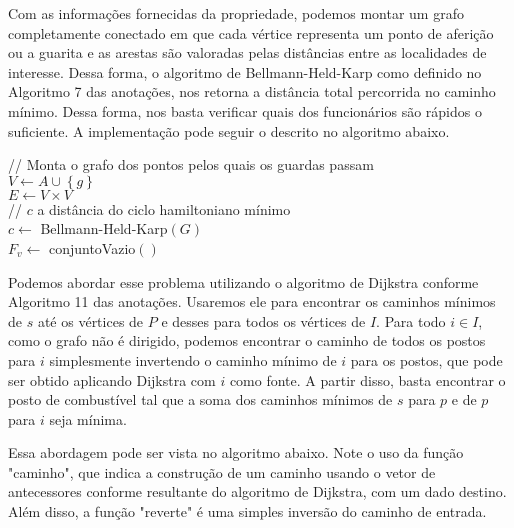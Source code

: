 \documentclass[a4paper]{report}
\begin{document}

Com as informações fornecidas da propriedade, podemos montar um grafo completamente conectado em que cada vértice representa um ponto de aferição ou a guarita e as arestas são valoradas pelas distâncias entre as localidades de interesse. Dessa forma, o algoritmo de Bellmann-Held-Karp como definido no Algoritmo 7 das anotações, nos retorna a distância total percorrida no caminho mínimo. Dessa forma, nos basta verificar quais dos funcionários são rápidos o suficiente. A implementação pode seguir o descrito no algoritmo abaixo.

\begin{algorithm}[H] 
    // Monta o grafo dos pontos pelos quais os guardas passam \\
    $V \gets A \cup \left\{ g \right\} $ \\
    $E \gets V\times V$ \\
    // $c$ a distância do ciclo hamiltoniano mínimo \\
    $c \gets$ Bellmann-Held-Karp$\left( G \right) $ \\

    $F_v \gets $ conjuntoVazio$()$\\
\end{algorithm}


Podemos abordar esse problema utilizando o algoritmo de Dijkstra conforme Algoritmo 11 das anotações. Usaremos ele para encontrar os caminhos mínimos de $s$ até os vértices de $P$ e desses para todos os vértices de $I$. Para todo $i \in I$, como o grafo não é dirigido, podemos encontrar o caminho de todos os postos para $i$ simplesmente invertendo o caminho mínimo de $i$ para os postos, que pode ser obtido aplicando Dijkstra com $i$ como fonte. A partir disso, basta encontrar o posto de combustível tal que a soma dos caminhos mínimos de $s$ para $p$ e de $p$ para $i$ seja mínima.

Essa abordagem pode ser vista no algoritmo abaixo. Note o uso da função "caminho", que indica a construção de um caminho usando o vetor de antecessores conforme resultante do algoritmo de Dijkstra, com um dado destino. Além disso, a função "reverte" é uma simples inversão do caminho de entrada.
\end{document}
